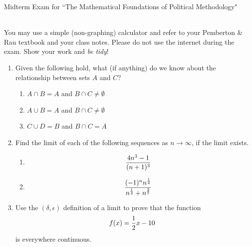 \documentclass[11pt]{article}
\begin{document}
\noindent \large Midterm Exam for ``The Mathematical Foundations of Political Methodology"

\normalsize
\ \\You may use a simple (non-graphing) calculator and refer to your Pemberton \& Rau textbook and your class notes.  Please do not use the internet during the exam.  Show your work and \textit{be tidy}!

\begin{enumerate}

\item Given the following hold, what (if anything) do we know about the relationship between sets $A$ and $C$?

\begin{enumerate}
\item $A\cap B= A$ and $B\cap C\not=\emptyset$
\item $A\cup B= A$ and $B\cap C\not=\emptyset$
\item $C \cup D=B$ and $B\cap C=A$

\end{enumerate}

\vspace{.2in}

\item Find the limit of each of the following sequences as $n\rightarrow \infty$, if the limit exists.
\begin{enumerate}
\item $${{4n^3-1}\over{(n+1)^3}}$$

\item $${{(-1)^n n^{1\over 2}}\over{n^{1\over 2}+n^{2\over 5}}}$$
\end{enumerate}

\vspace{.2in}

\item Use the $(\delta, \epsilon)$ definition of a limit to prove that the function $$f(x)={1\over 2}x-10$$ is everywhere continuous.



\end{enumerate}
\end{document}
